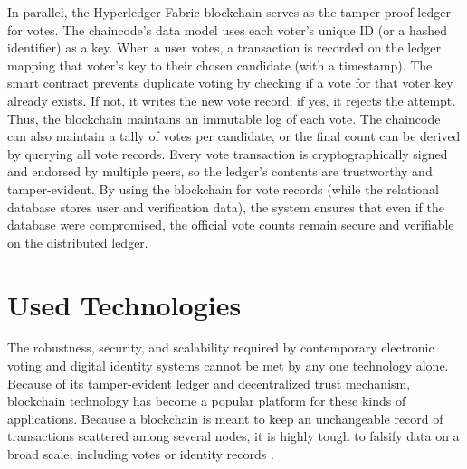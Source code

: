 \documentclass[a4paper,10pt]{report}
\begin{document}
In parallel, the Hyperledger Fabric blockchain serves as the tamper-proof ledger for votes. The chaincode’s data model uses each voter’s unique ID (or a hashed identifier) as a key. When a user votes, a transaction is recorded on the ledger mapping that voter’s key to their chosen candidate (with a timestamp). The smart contract prevents duplicate voting by checking if a vote for that voter key already exists. If not, it writes the new vote record; if yes, it rejects the attempt. Thus, the blockchain maintains an immutable log of each vote. The chaincode can also maintain a tally of votes per candidate, or the final count can be derived by querying all vote records. Every vote transaction is cryptographically signed and endorsed by multiple peers, so the ledger’s contents are trustworthy and tamper-evident. By using the blockchain for vote records (while the relational database stores user and verification data), the system ensures that even if the database were compromised, the official vote counts remain secure and verifiable on the distributed ledger.


\chapter{Used Technologies}

 The robustness, security, and scalability required by contemporary electronic voting and digital identity systems cannot be met by any one technology alone. Because of its tamper-evident ledger and decentralized trust mechanism, blockchain technology has become a popular platform for these kinds of applications. Because a blockchain is meant to keep an unchangeable record of transactions scattered among several nodes, it is highly tough to falsify data on a broad scale, including votes or identity records \cite{jafar2021blockchain}.
\end{document}
